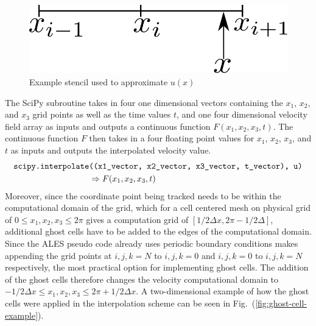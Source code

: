 \begin{figure}[H]
    \includegraphics[height=0.075\textheight]{media/rk4/interpolation}
    \caption{Example stencil used to approximate $u(x)$}
    \label{fig:linear-interp-stencil}
\end{figure}
The SciPy subroutine takes in four one dimensional vectors
containing the $x_{1}$, $x_{2}$, and $x_{3}$ grid points as well as the
time values $t$, and one four dimensional velocity field  array as inputs
and outputs a continuous function $F(x_{1}, x_{2}, x_{3}, t)$. The
continuous function $F$ then takes in a four floating point values for
$x_{1}$, $x_{2}$, $x_{3}$, and $t$ as inputs and outputs the interpolated
velocity value.
\begin{equation}
    \begin{aligned}
        \text{\texttt{scipy.interpolate}}&\text{\texttt{((x1\_vector, x2\_vector, x3\_vector, t\_vector), u)}} \\ 
                & \Rightarrow F(x_{1}, x_{2}, x_{3}, t)
    \end{aligned}
\end{equation}
Moreover, since the coordinate point being tracked needs to be within the
computational domain of the grid, which for a cell centered mesh on
physical grid of $0 \leq x_{1}, x_{2}, x_{3} \leq 2\pi$ gives a computation
grid of $[1/2 \Delta x, 2\pi-1/2 \Delta]$, additional ghost cells have to
be added to the edges of the computational domain. Since the ALES pseudo
code already uses periodic boundary conditions makes appending the grid
points at $i,j,k=N$ to $i,j,k=0$ and $i,j,k=0$ to $i,j,k=N$ respectively,
the most practical option for implementing ghost cells. The addition of the
ghost cells therefore changes the velocity computational domain to
$-1/2 \Delta x \leq x_{1}, x_{2}, x_{3} \leq 2\pi + 1/2 \Delta x$. A
two-dimensional example of how the ghost cells were applied in the
interpolation scheme can be seen in Fig.~(\ref{fig:ghost-cell-example}).
